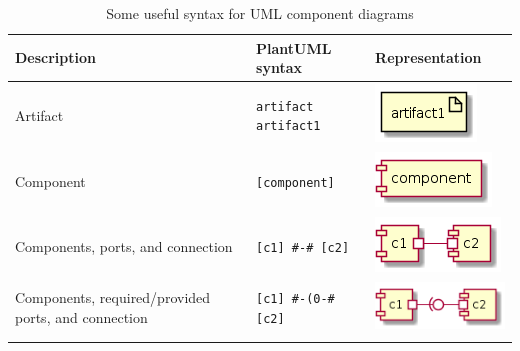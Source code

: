 \begin{longtable}{>{\centering}m{1.8in} >{\centering}m{2in} >{\centering\arraybackslash}m{1.5in}}
\toprule
\textbf{Description} & \textbf{PlantUML syntax} & \textbf{Representation} \\
\midrule
Artifact & \texttt{artifact artifact1} & \includegraphics[width=0.45\linewidth]{figure/plantuml_example/artifact.png} \\ \hline
Component & \texttt{[component]} & \includegraphics[width=0.6\linewidth]{figure/plantuml_example/component.png} \\ \hline
Components, ports, and connection &  \texttt{[c1] \#-\# [c2]} & \includegraphics[width=0.7\linewidth]{figure/plantuml_example/port.png}\\ \hline
Components, required/provided ports, and connection & \texttt{[c1] \#-(0-\# [c2]} & \includegraphics[width=0.8\linewidth]{figure/plantuml_example/port_type.png}\\
\bottomrule
\caption{Some useful syntax for UML component diagrams}
\label{table:plantuml_component_syntax}
\end{longtable}

